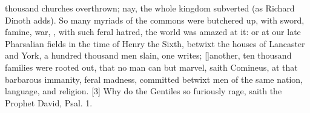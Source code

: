 {thousand churches overthrown; nay, the whole kingdom subverted (as
Richard Dinoth adds). So many myriads of the commons were
butchered up, with sword, famine, war, , with such feral hatred, the
world was amazed at it: or at our late Pharsalian fields in the time of
Henry the Sixth, betwixt the houses of Lancaster and York, a hundred
thousand men slain, one writes; [\baselineskip]another, ten thousand
families were rooted out, that no man can but marvel, saith Comineus,
at that barbarous immanity, feral madness, committed betwixt men of the
same nation, language, and religion. [3\baselineskip] Why do
the Gentiles so furiously rage, saith the Prophet David, Psal.  1.

}
